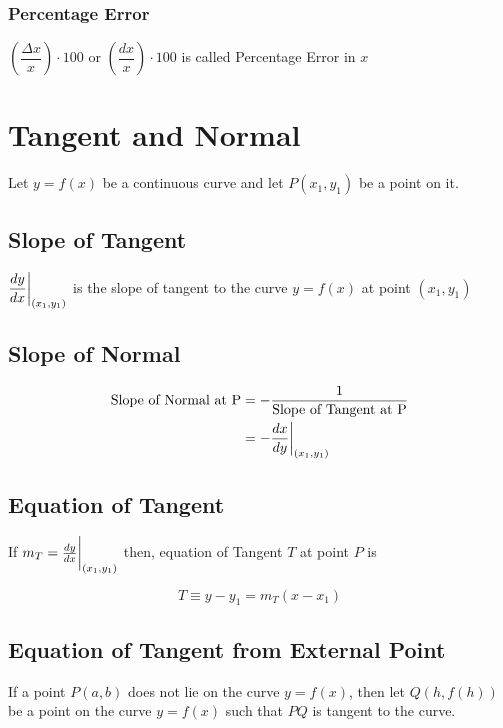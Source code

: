 \documentclass{article}
\begin{document}
\subsubsection*{Percentage Error}
$\left(\dfrac{\Delta x}{x}\right) \cdot 100$ or $\left(\dfrac{dx}{x}\right) \cdot 100$ is called Percentage Error in $x$

\section{Tangent and Normal}

Let $y=f(x)$ be a continuous curve and let $P\left(x_{1},y_{1}\right)$ be a point on it.
\subsection{Slope of Tangent}

$\displaystyle\dv{y}{x} \biggr\rvert_{\left(x_{1},y_{1}\right)}$ is the slope of tangent to the curve $y=f(x)$ at point $\left(x_{1},y_{1}\right)$

\subsection{Slope of Normal}
\begin{equation*}
    \begin{split}
        \text{Slope of Normal at P} & = - \dfrac{1}{\text{Slope of Tangent at P}}            \\
                                    & =  - \dv{x}{y} \biggr\rvert_{\left(x_{1},y_{1}\right)}
    \end{split}
\end{equation*}

\subsection{Equation of Tangent}
If $m_{T}=\dv{y}{x} \biggr\rvert_{\left(x_{1},y_{1}\right)}$ then, equation of Tangent $T$ at point $P$ is

$$T \equiv y-y_{1}=m_{T}\left(x-x_{1}\right)$$

\subsection*{Equation of Tangent from External Point}
If a point $P \left(a,b\right)$ does not lie on the curve $y=f(x)$, then let $Q(h,f(h))$ be a point on the curve $y=f(x)$ such that $PQ$ is tangent to the curve.
\end{document}
